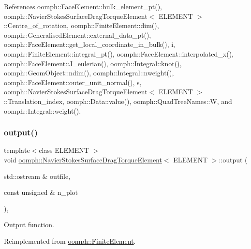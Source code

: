 References oomph\+::\+Face\+Element\+::bulk\+\_\+element\+\_\+pt(), oomph\+::\+Navier\+Stokes\+Surface\+Drag\+Torque\+Element$<$ E\+L\+E\+M\+E\+N\+T $>$\+::\+Centre\+\_\+of\+\_\+rotation, oomph\+::\+Finite\+Element\+::dim(), oomph\+::\+Generalised\+Element\+::external\+\_\+data\+\_\+pt(), oomph\+::\+Face\+Element\+::get\+\_\+local\+\_\+coordinate\+\_\+in\+\_\+bulk(), i, oomph\+::\+Finite\+Element\+::integral\+\_\+pt(), oomph\+::\+Face\+Element\+::interpolated\+\_\+x(), oomph\+::\+Face\+Element\+::\+J\+\_\+eulerian(), oomph\+::\+Integral\+::knot(), oomph\+::\+Geom\+Object\+::ndim(), oomph\+::\+Integral\+::nweight(), oomph\+::\+Face\+Element\+::outer\+\_\+unit\+\_\+normal(), s, oomph\+::\+Navier\+Stokes\+Surface\+Drag\+Torque\+Element$<$ E\+L\+E\+M\+E\+N\+T $>$\+::\+Translation\+\_\+index, oomph\+::\+Data\+::value(), oomph\+::\+Quad\+Tree\+Names\+::W, and oomph\+::\+Integral\+::weight().

\mbox{\label{classoomph_1_1NavierStokesSurfaceDragTorqueElement_a33f0eed12184789804f001c58d5fea87}} 
\subsubsection{\texorpdfstring{output()}{output()}}
{\footnotesize\ttfamily template$<$class E\+L\+E\+M\+E\+NT $>$ \\
void \hyperlink{classoomph_1_1NavierStokesSurfaceDragTorqueElement}{oomph\+::\+Navier\+Stokes\+Surface\+Drag\+Torque\+Element}$<$ E\+L\+E\+M\+E\+NT $>$\+::output (\begin{DoxyParamCaption}\item[{std\+::ostream \&}]{outfile,  }\item[{const unsigned \&}]{n\+\_\+plot }\end{DoxyParamCaption})\hspace{0.3cm}{\ttfamily [inline]}, {\ttfamily [virtual]}}



Output function. 



Reimplemented from \hyperlink{classoomph_1_1FiniteElement_afa9d9b2670f999b43e6679c9dd28c457}{oomph\+::\+Finite\+Element}.



